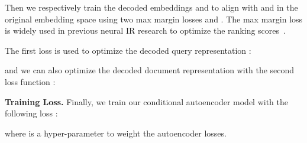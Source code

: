 \documentclass[11pt]{article}
\begin{document}
Then we respectively train the decoded embeddings  and  to align with  and  in the original embedding space using two max margin losses  and . The max margin loss is widely used in previous neural IR research to optimize the ranking scores~\cite{xiong2017knrm,convknrm}.

The first loss  is used to optimize the decoded query representation :

and we can also optimize the decoded document representation  with the second loss function :


\textbf{Training Loss.} Finally, we train our conditional autoencoder model with the following loss :

where  is a hyper-parameter to weight the autoencoder losses. \begin{table}
\centering
\small
\caption{Data Statistics.}
\label{tab:dataset}
\end{table} 
\end{document}
